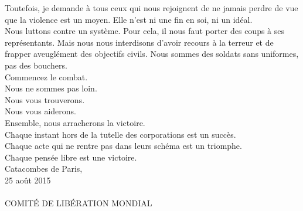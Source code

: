\documentclass[11pt,twoside,a4paper]{article}
\begin{document}
\begin{multicols}{2}
Toutefois, je demande {\`a} tous ceux qui nous rejoignent de ne jamais perdre de vue que la violence est un moyen. Elle n'est ni une fin en soi, ni un id{\'e}al. ~\\ 

Nous luttons contre un syst{\`e}me. Pour cela, il nous faut porter des coups {\`a} ses repr{\'e}sentants. Mais nous nous interdisons d'avoir recours {\`a} la terreur et de frapper aveugl{\'e}ment des objectifs civils. Nous sommes des soldats sans uniformes, pas des bouchers. ~\\ 

Commencez le combat. ~\\
Nous ne sommes pas loin. ~\\
Nous vous trouverons. ~\\
Nous vous aiderons. ~\\
Ensemble, nous arracherons la victoire. ~\\

Chaque instant hors de la tutelle des corporations est un succ{\`e}s. ~\\
Chaque acte qui ne rentre pas dans leurs sch{\'e}ma est un triomphe. ~\\
Chaque pens{\'e}e libre est une victoire. ~\\

Catacombes de Paris, ~\\
25 ao{\^u}t 2015 ~\\~\\

{\large COMIT{\'E} DE LIB{\'E}RATION MONDIAL}~\\

\end{multicols} 
\end{document}
